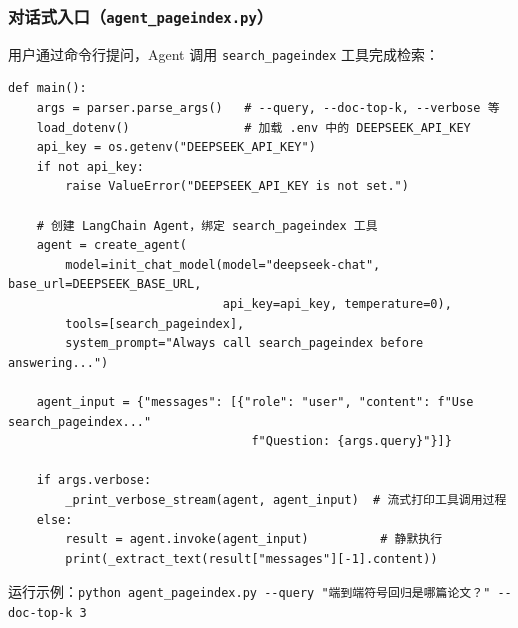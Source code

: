 \documentclass[presentation,aspectratio=169,fontset=none]{ctexbeamer}
\begin{document}
\begin{frame}[fragile]
\frametitle{对话式入口（\texttt{agent\_pageindex.py}）}
{\scriptsize 用户通过命令行提问，Agent 调用 \texttt{search\_pageindex} 工具完成检索：}

\vspace{0.05cm}
{\tiny
\begin{verbatim}
def main():
    args = parser.parse_args()   # --query, --doc-top-k, --verbose 等
    load_dotenv()                # 加载 .env 中的 DEEPSEEK_API_KEY
    api_key = os.getenv("DEEPSEEK_API_KEY")
    if not api_key:
        raise ValueError("DEEPSEEK_API_KEY is not set.")

    # 创建 LangChain Agent，绑定 search_pageindex 工具
    agent = create_agent(
        model=init_chat_model(model="deepseek-chat", base_url=DEEPSEEK_BASE_URL,
                              api_key=api_key, temperature=0),
        tools=[search_pageindex],
        system_prompt="Always call search_pageindex before answering...")

    agent_input = {"messages": [{"role": "user", "content": f"Use search_pageindex..."
                                  f"Question: {args.query}"}]}

    if args.verbose:
        _print_verbose_stream(agent, agent_input)  # 流式打印工具调用过程
    else:
        result = agent.invoke(agent_input)          # 静默执行
        print(_extract_text(result["messages"][-1].content))
\end{verbatim}}

\vspace{0.05cm}
{\scriptsize 运行示例：\texttt{python agent\_pageindex.py -{}-query "端到端符号回归是哪篇论文？" -{}-doc-top-k 3}}
\end{frame}

\end{document}
